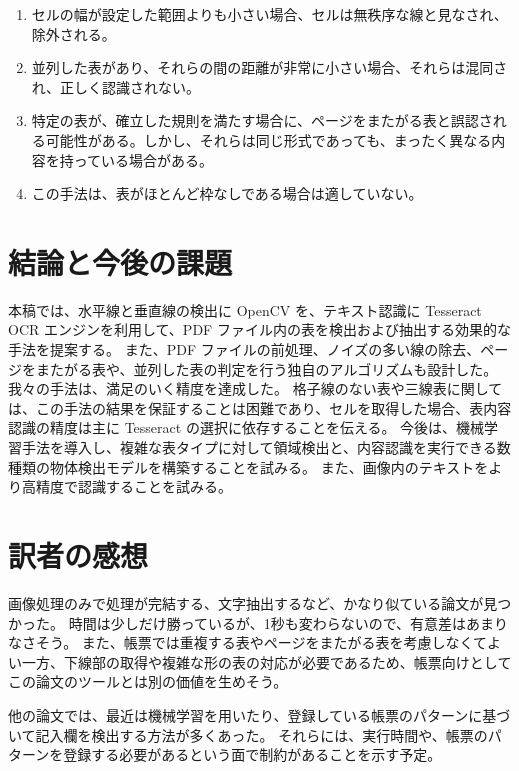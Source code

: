 \documentclass[uplatex, twocolumn,10pt]{jsarticle}
\begin{document}
\begin{enumerate}
    \item セルの幅が設定した範囲よりも小さい場合、セルは無秩序な線と見なされ、除外される。
    \item 並列した表があり、それらの間の距離が非常に小さい場合、それらは混同され、正しく認識されない。
    \item 特定の表が、確立した規則を満たす場合に、ページをまたがる表と誤認される可能性がある。しかし、それらは同じ形式であっても、まったく異なる内容を持っている場合がある。
    \item この手法は、表がほとんど枠なしである場合は適していない。
\end{enumerate}


\section{結論と今後の課題}
本稿では、水平線と垂直線の検出に OpenCV を、テキスト認識に Tesseract OCR エンジンを利用して、PDF ファイル内の表を検出および抽出する効果的な手法を提案する。
また、PDF ファイルの前処理、ノイズの多い線の除去、ページをまたがる表や、並列した表の判定を行う独自のアルゴリズムも設計した。
我々の手法は、満足のいく精度を達成した。
格子線のない表や三線表に関しては、この手法の結果を保証することは困難であり、セルを取得した場合、表内容認識の精度は主に Tesseract の選択に依存することを伝える。
今後は、機械学習手法を導入し、複雑な表タイプに対して領域検出と、内容認識を実行できる数種類の物体検出モデルを構築することを試みる。
また、画像内のテキストをより高精度で認識することを試みる。






\section{訳者の感想}
画像処理のみで処理が完結する、文字抽出するなど、かなり似ている論文が見つかった。
時間は少しだけ勝っているが、1秒も変わらないので、有意差はあまりなさそう。
また、帳票では重複する表やページをまたがる表を考慮しなくてよい一方、下線部の取得や複雑な形の表の対応が必要であるため、帳票向けとしてこの論文のツールとは別の価値を生めそう。

他の論文では、最近は機械学習を用いたり、登録している帳票のパターンに基づいて記入欄を検出する方法が多くあった。
それらには、実行時間や、帳票のパターンを登録する必要があるという面で制約があることを示す予定。
\end{document}
